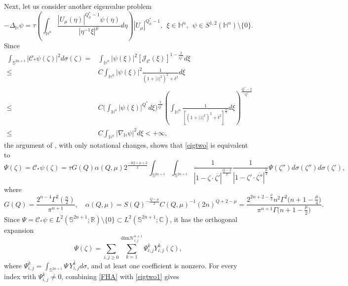 \documentclass[10pt,a4paper]{amsart}
\begin{document}
Next, let us consider another eigenvalue problem
\begin{equation}\label{eigtwo}
 -\Delta_{\mathbb{H}} \psi=\tau\left(\int_{\mathbb{H}^{n}}\frac{|U_\mu(\eta)|
^{Q^{\ast}_{\mu}-1}\psi(\eta)}{|\eta^{-1}\xi|^{\mu}}{d}\eta\right)|U_\mu|^{Q^{\ast}_{\mu}-1},~~\xi\in\mathbb{H}^{n},~~ \psi\in S^{1,2}(\mathbb{H}^{n})\setminus \{0\}.
\end{equation}
Since
\begin{align*}
 \int_{\mathbb{S}^{2n+1}}|\mathcal{C}_*\psi(\zeta)|^2 d \sigma(\zeta)=&\int_{\mathbb{H}^n}|\psi(\xi)|^2
 [\mathcal{J}_\mathcal{C}(\xi)]^{1-\frac{2}{Q^{\ast}}}d \xi\\ \leq & C \int_{\mathbb{H}^n}|\psi(\xi)|^2
 \frac{1}{(1+|z|^2)^2+t^2}d \xi\\
 \leq & C \bigg(\int_{\mathbb{H}^n}|\psi(\xi)|^{Q^{\ast}}d \xi\bigg)^{\frac{2}{Q^{\ast}}}
 \left(\int_{\mathbb{H}^n}\frac{1}{[(1+|z|^2)^2+t^2]^{\frac{Q}{2}}}d \xi\right)^{\frac{Q^{\ast}-2}{Q^{\ast}}}\\
 \leq & C \int_{\mathbb{H}^{n}}|\nabla_{\mathbb{H}}\psi|^{2}{d}\xi<+\infty,
\end{align*}
{the argument of \cite[Lemma 4.5]{YZ251}, with only notational changes, shows that \eqref{eigtwo} is equivalent to}
\begin{equation}\label{eigtwo1}
 \Psi(\zeta)= \mathcal{C}_*\psi(\zeta)=\tau G(Q)\alpha(Q,\mu)2^{\frac{-3Q+\mu+2}{2}}\int_{\mathbb{S}^{2n+1}}\int_{\mathbb{S}^{2n+1}}
 \frac{1}{|1-\zeta\cdot \overline{\zeta'}|^{\frac{Q-2}{2}}}\frac{1}{|1-\zeta'\cdot \overline{\zeta''}|^{\frac{\mu}{2}}}\Psi(\zeta'')d \sigma(\zeta'')d \sigma(\zeta'),
\end{equation}
where
\begin{equation*}
 G(Q)=\frac{2^{n-4}\Gamma^2(\frac{n}{2})}{\pi^{n+1}},\quad \alpha(Q,\mu)=S(Q)^{-\frac{Q-\mu}{2}}C(Q,\mu)^{-1}(2n)^{Q+2-\mu}
 =\frac{2^{2n+2-\frac{\mu}{2}}n^2\Gamma^2\big(n+1-\frac{\mu}{4}\big)}{\pi^{n+1}\Gamma\big(n+1-\frac{\mu}{2}\big)
 }.
\end{equation*}
{Since $\Psi=\mathcal{C}_*\psi\in L^2(\mathbb{S}^{2n+1};\mathbb R)\setminus\{0\}\subset L^2(\mathbb{S}^{2n+1};\mathbb C)$, it has the orthogonal expansion}
\begin{equation*}
 \Psi(\zeta)=\sum\limits_{i,j\geq0}\sum\limits_{k=1}^{\mathrm{dim} \mathcal{H}_{i,j}^{n+1}}\Psi_{i,j}^k Y_{i,j}^k(\zeta),
\end{equation*}
{where $\Psi_{i,j}^k=\int_{\mathbb{S}^{2n+1}}\Psi\,\overline{Y_{i,j}^k}d\sigma$, and at least one coefficient is nonzero. For every index with $\Psi_{i,j}^k\neq0$, combining \eqref{FHA} with \eqref{eigtwo1} gives}
\end{document}
